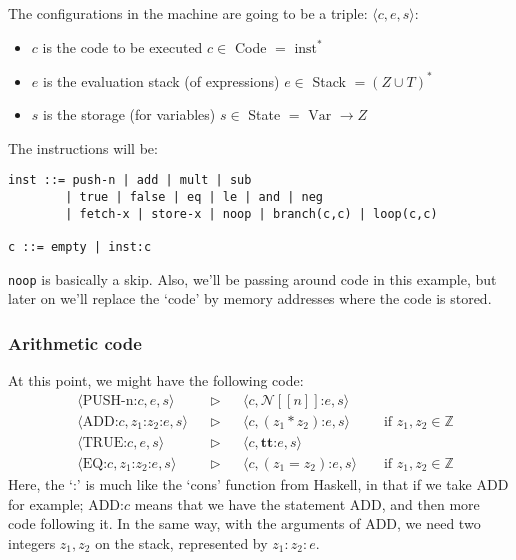 \documentclass[11pt,a4paper,titlepage,dvipsnames,cmyk]{scrartcl}
\begin{document}
The configurations in the machine are going to be a triple: $\langle c, e,
s \rangle$:
\begin{itemize}
    \item $c$ is the code to be executed $c \in$ Code $= \text{ inst}^*$
    \item $e$ is the evaluation stack (of expressions) $e \in$ Stack $= (Z
        \cup T)^*$
    \item $s$ is the storage (for variables) $s \in$ State $= \text{ Var }
        \rightarrow Z$
\end{itemize}

The instructions will be:

\begin{lstlisting}
inst ::= push-n | add | mult | sub
        | true | false | eq | le | and | neg
        | fetch-x | store-x | noop | branch(c,c) | loop(c,c)

c ::= empty | inst:c
\end{lstlisting}

\lstinline|noop| is basically a skip. Also, we'll be passing around code
in this example, but later on we'll replace the `code' by memory addresses
where the code is stored.

\subsubsection{Arithmetic code}%
\label{ssub:code-1}
At this point, we might have the following code:
\begin{align*}
    &\langle \text{PUSH-n:}c, e, s \rangle &  &\triangleright & &\langle c,
    \mathcal{N}[[n]] \text{:}e, s \rangle \\
    &\langle \text{ADD:}c, z_1 \text{:} z_2 \text{:}e, s \rangle & &\triangleright & &\langle c,
    (z_1 * z_2) \text{:}e, s \rangle & &\text{ if } z_1, z_2 \in \mathbb{Z} \\
     &\langle \text{TRUE:}c, e, s \rangle & &\triangleright & &\langle c,
     \textbf{tt}\text{:}e, s \rangle \\
     &\langle \text{EQ:}c, z_1 \text{:} z_2 \text{:}e, s \rangle & &\triangleright &
     &\langle c, (z_1 = z_2) \text{:}e, s \rangle & &\text{ if } z_1,z_2 \in
     \mathbb{Z}
\end{align*}
Here, the `:' is much like the `cons' function from Haskell, in that if we
take ADD for example; ADD:$c$ means that we have the statement ADD, and
then more code following it. In the same way, with the arguments of ADD,
we need two integers $z_1, z_2$ on the stack, represented by $z_1 : z_2 :
e$.
\end{document}
